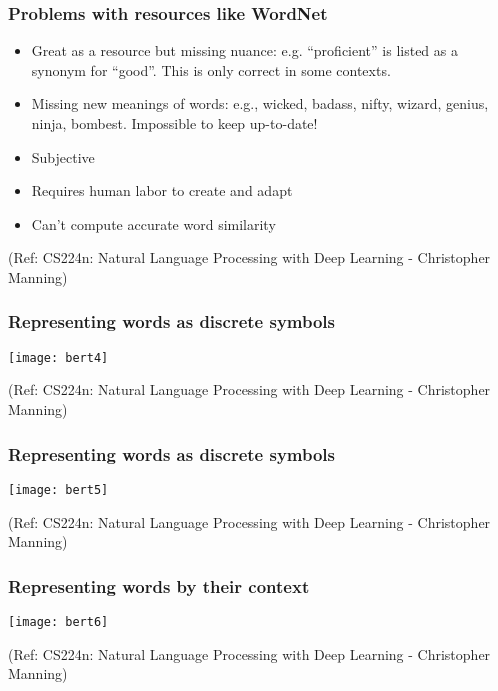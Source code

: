 \begin{frame}[fragile]\frametitle{Problems with resources like WordNet}


\begin{itemize}
\item Great as a resource but missing nuance: e.g. ``proficient'' is listed as a synonym for ``good''.  This is only correct in some contexts.
\item Missing new meanings of words: e.g., wicked, badass, nifty, wizard, genius, ninja, bombest. Impossible to keep up-to-date!
\item Subjective
\item Requires human labor to create and adapt
\item Can't compute accurate word similarity 
\end{itemize}

{\tiny (Ref: CS224n: Natural Language Processing with Deep Learning - Christopher Manning)}

\end{frame}

\begin{frame}[fragile]\frametitle{Representing words as discrete symbols}


\begin{center}
\texttt{[image: bert4]}
\end{center}		  


{\tiny (Ref: CS224n: Natural Language Processing with Deep Learning - Christopher Manning)}

\end{frame}

\begin{frame}[fragile]\frametitle{Representing words as discrete symbols}


\begin{center}
\texttt{[image: bert5]}
\end{center}		  


{\tiny (Ref: CS224n: Natural Language Processing with Deep Learning - Christopher Manning)}

\end{frame}

\begin{frame}[fragile]\frametitle{Representing words by their context}


\begin{center}
\texttt{[image: bert6]}
\end{center}		  


{\tiny (Ref: CS224n: Natural Language Processing with Deep Learning - Christopher Manning)}

\end{frame}

